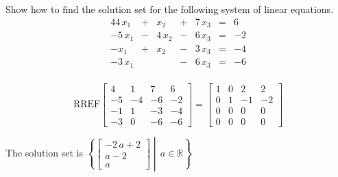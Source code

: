 
\begin{exerciseStatement}


Show how to find the solution set for the following system of linear equations. 
\begin{alignat*}{4} 4 \, x_{1} &+& x_{2} &+& 7 \, x_{3} &=& 6 \\-5 \, x_{1} &-& 4 \, x_{2} &-& 6 \, x_{3} &=& -2 \\-x_{1} &+& x_{2} &-& 3 \, x_{3} &=& -4 \\-3 \, x_{1} & &  &-& 6 \, x_{3} &=& -6 \\ \end{alignat*}
            


\end{exerciseStatement}
    
\begin{exerciseAnswer} 
\[\mathrm{RREF} \left[\begin{array}{ccc|c}
4 & 1 & 7 & 6 \\
-5 & -4 & -6 & -2 \\
-1 & 1 & -3 & -4 \\
-3 & 0 & -6 & -6
\end{array}\right]  =  \left[\begin{array}{ccc|c}
1 & 0 & 2 & 2 \\
0 & 1 & -1 & -2 \\
0 & 0 & 0 & 0 \\
0 & 0 & 0 & 0
\end{array}\right] \]

The solution set is \( \left\{ \left[\begin{array}{c}
-2 \, a + 2 \\
a - 2 \\
a
\end{array}\right] \middle|\,a\in\mathbb{R}\right\} \)


\end{exerciseAnswer}
    
